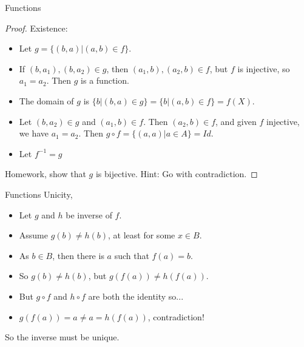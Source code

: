 \documentclass[aspectratio=169]{beamer}
\begin{document}
\begin{frame}{Functions}
    
    \begin{proof}
    
    Existence:
    
        \begin{itemize}
        
        \item Let $g = \{(b,a)|(a,b)\in f\}$. \pause
        
        \item If $(b,a_1),(b,a_2)\in g$, then $(a_1,b),(a_2,b)\in f$, but $f$ is injective, so $a_1 = a_2$. Then $g$ is a function.\pause
        
        \item The domain of $g$ is $\{b|(b,a)\in g\} = \{b|(a,b)\in f\} = f(X)$.\pause
        
        \item Let $(b,a_2)\in g$ and $(a_1,b)\in f$. Then $(a_2,b)\in f$, and given $f$ injective, we have $a_1=a_2$. Then $g\circ f = \{(a,a)|a\in A\} = Id.$\pause
        
        \item Let $f^{-1} = g$
        
        \end{itemize}
        
        Homework, show that $g$ is bijective. Hint: Go with contradiction.
    \end{proof}
    
\end{frame}

\begin{frame}{Functions}
    Unicity,
    
    \begin{itemize}
        \item Let $g$ and $h$ be inverse of $f$.\pause
        
        \item Assume $g(b)\neq h(b)$, at least for some $x\in B$.\pause
        
        \item As $b\in B$, then there is $a$ such that $f(a)=b$.\pause
        
        \item So $g(b) \neq h(b)$, but $g(f(a)) \neq h(f(a))$.\pause
        
        \item But $g\circ f$ and $h\circ f$ are both the identity so...\pause
        
        \item $g(f(a)) = a \neq a = h(f(a))$, contradiction!
        
    \end{itemize}
    
    So the inverse must be unique.
    
\end{frame}
\end{document}
